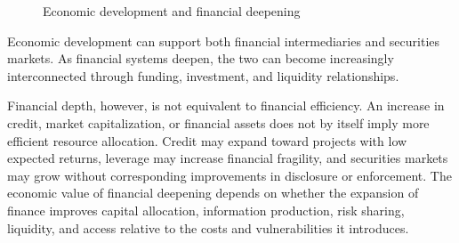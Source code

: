 \begin{figure}[htbp]
\centering


\caption{Economic development and financial deepening}
\label{fig:ch4-financial-deepening}
\end{figure}

Economic development can support both financial intermediaries and securities markets. As financial systems deepen, the two can become increasingly interconnected through funding, investment, and liquidity relationships.

Financial depth, however, is not equivalent to financial efficiency. An increase in credit, market capitalization, or financial assets does not by itself imply more efficient resource allocation. Credit may expand toward projects with low expected returns, leverage may increase financial fragility, and securities markets may grow without corresponding improvements in disclosure or enforcement. The economic value of financial deepening depends on whether the expansion of finance improves capital allocation, information production, risk sharing, liquidity, and access relative to the costs and vulnerabilities it introduces.

